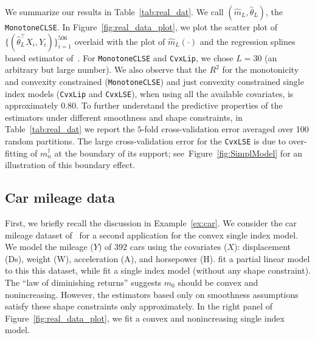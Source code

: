 {We summarize our results in Table~\ref{tab:real_dat}. We call $(\hat{m}_L,\hat{\theta}_L)$, the \texttt{MonotoneCLSE}. In Figure~\ref{fig:real_data_plot}, we plot the scatter plot of $\{(\hat{\theta}^\top_L X_i, Y_i)\}_{i=1}^{506}$  overlaid with the plot of $\hat{m}_L(\cdot)$ and the regression splines based estimator of~\cite{MR2529970}.  For \texttt{MonotoneCLSE} and \texttt{CvxLip}, we chose $L= 30$ (an arbitrary but large number). We also observe that the $R^2$ for the monotonicity and convexity constrained (\texttt{MonotoneCLSE}) and just convexity constrained single index models (\texttt{CvxLip} and \texttt{CvxLSE}), when using all the available covariates, is approximately $0.80$. {To further understand the predictive properties of the estimators under different smoothness and shape constraints, in Table~\ref{tab:real_dat} we report the $5$-fold cross-validation error averaged over 100 random partitions.  The large cross-validation error for the \texttt{CvxLSE} is due to over-fitting of $m_n^\dagger$ at the boundary of its support; see~Figure~\ref{fig:SimplModel} for an illustration of this boundary effect.}




\subsection{Car mileage data}\label{sec:car}
First, we briefly recall the discussion in Example~\ref{ex:car}. We consider the car mileage dataset of~\citet{cars_1983} for a second application for the convex single index model. We model the mileage ($Y$) of $392$ cars using the covariates ($X$):  displacement (Ds),   weight (W),  acceleration (A),   and horsepower (H).  \citet{MR2957294} fit a partial linear model to this this dataset, while \cite{Patra16} fit a single index model (without any shape constraint). The ``law of diminishing returns'' suggests $m_0$ should be convex and nonincreasing. However, the estimators based only on smoothness assumptions satisfy these shape constraints only approximately.  In the right panel of Figure~\ref{fig:real_data_plot}, we fit a convex and nonincreasing single index model. 

}
